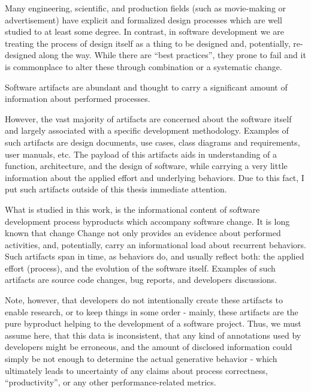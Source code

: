 \documentclass[11pt,oneside]{article}
\numberwithin{equation}{subsection}
\begin{document}
Many engineering, scientific, and production fields (such as movie-making or advertisement) have explicit 
and formalized design processes which are well studied to at least some degree. In contrast, in software 
development we are treating the process of design itself as a thing to be designed and, potentially, 
re-designed along the way. While there are ``best practices'', they prone to fail and it is commonplace
to alter these through combination or a systematic change.



Software artifacts are abundant and thought to carry a significant amount of information about performed 
processes.

However, the vast majority of artifacts are concerned about the software itself and largely associated 
with a specific development methodology. Examples of such artifacts are design documents, use cases, class 
diagrams and requirements, user manuals, etc. The payload of this artifacts aids in understanding of 
a function, architecture, and the design of software, while carrying a very little information about the 
applied effort and underlying behaviors. Due to this fact, I put such artifacts outside of this thesis
immediate attention.

What is studied in this work, is the informational content of software development process byproducts 
which accompany software change. It is long known that change Change not only provides an evidence about performed activities, and, potentially, 
carry an informational load about
recurrent behaviors. Such artifacts span in time, as behaviors do, and usually reflect both: the applied 
effort (process), and the evolution of the software itself. 
Examples of such artifacts are source code changes, bug reports, and developers discussions.

Note, however, that developers do not intentionally create these artifacts to enable research, or to keep 
things in some order - mainly, these artifacts are the pure byproduct helping to the development of a 
software project. Thus, we must assume here, that this data is inconsistent, that any kind of annotations 
used by developers might be erroneous, and the amount of disclosed information could simply be not enough
to determine the actual generative behavior - which ultimately leads to uncertainty of any claims about
process correctness, ``productivity'', or any other performance-related metrics. 
\end{document}
